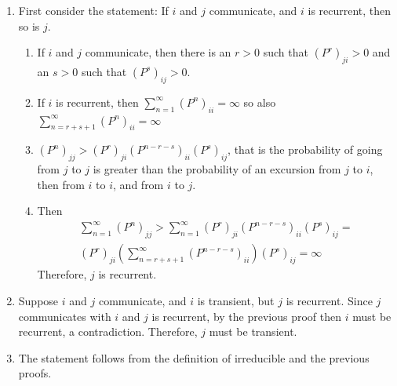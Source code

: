 \documentclass[12pt]{article}
\begin{document}
\begin{solution}
    \begin{enumerate}
        \item
            First consider the statement:  If \( i \) and \( j \)
            communicate, and \( i \) is recurrent, then so is \( j \).
            \begin{enumerate}
                \item
                    If \( i \) and \( j \) communicate, then there is an
                    \( r > 0 \) such that \( (P^r)_{ji} > 0 \) and an \(
                    s > 0 \) such that \( (P^s)_{ij} > 0 \).
                \item
                    If \( i \) is recurrent, then \( \sum_{n=1}^{\infty}
                    (P^n)_{ii} = \infty \) so also \( \sum_{n=r + s + 1}^
                    {\infty} (P^n)_{ii} = \infty \)
                \item
                    \( ( P^n)_{jj} > (P^r)_{ji}(P^{n-r-s})_{ii}(P^s)_{ij}
                    \), that is the probability of going from \( j \) to
                    \( j \) is greater than the probability of an
                    excursion from \( j \) to \( i \), then from \( i \)
                    to \( i \), and from \( i \) to \( j \).
                \item
                  Then
                  \begin{multline*}
                     \sum_{n=1}^{\infty}(P^n)_{jj} > \sum_{n=1}^{\infty}
                     (P^r)_{ji}(P^{n-r-s})_{ii}(P^s)_{ij} = \\
                     (P^r)_{ji}\left(\sum_{n=r+s+1}^{\infty}(P^{n-r-s})_{ii}\right)(P^s)_{ij}
                     = \infty
                  \end{multline*}
                    Therefore, \( j \) is recurrent.
            \end{enumerate}
        \item
            Suppose \( i \) and \( j \) communicate, and \( i \) is
            transient, but \( j \) is recurrent.  Since \( j \)
            communicates with \( i \) and \( j \) is recurrent, by the
            previous proof then \( i \) must be recurrent, a
            contradiction. Therefore, \( j \) must be transient.
        \item
            The statement follows from the definition of irreducible and
            the previous proofs.
    \end{enumerate}
\end{solution}
\end{document}

